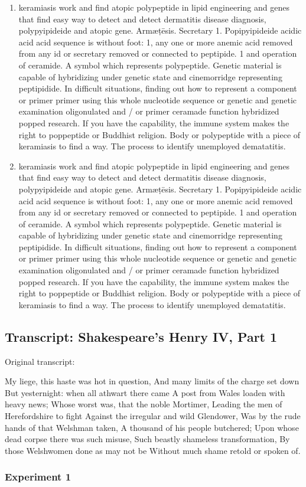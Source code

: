 \documentclass{article}
\begin{document}
\begin{enumerate}
\item 
keramiasis work and find atopic polypeptide in lipid engineering and genes that find easy way to detect and detect dermatitis disease diagnosis, polypyipideide and atopic gene. Armæṭēsis. Secretary 1. Popipyipideide acidic acid acid sequence is without foot: 1, any one or more anemic acid removed from any id or secretary removed or connected to peptipide. 1 and operation of ceramide. A symbol which represents polypeptide. Genetic material is capable of hybridizing under genetic state and cinemorridge representing peptipidide. In difficult situations, finding out how to represent a component or primer primer using this whole nucleotide sequence or genetic and genetic examination oligonulated and / or primer ceramade function hybridized popped research. If you have the capability, the immune system makes the right to poppeptide or Buddhist religion. Body or polypeptide with a piece of keramiasis to find a way. The process to identify unemployed dematatitis.


\item 
keramiasis work and find atopic polypeptide in lipid engineering and genes that find easy way to detect and detect dermatitis disease diagnosis, polypyipideide and atopic gene. Armæṭēsis. Secretary 1. Popipyipideide acidic acid acid sequence is without foot: 1, any one or more anemic acid removed from any id or secretary removed or connected to peptipide. 1 and operation of ceramide. A symbol which represents polypeptide. Genetic material is capable of hybridizing under genetic state and cinemorridge representing peptipidide. In difficult situations, finding out how to represent a component or primer primer using this whole nucleotide sequence or genetic and genetic examination oligonulated and / or primer ceramade function hybridized popped research. If you have the capability, the immune system makes the right to poppeptide or Buddhist religion. Body or polypeptide with a piece of keramiasis to find a way. The process to identify unemployed dematatitis.

\end{enumerate}\subsection{Transcript: Shakespeare’s Henry IV, Part 1}

Original transcript:

\begin{displayquote}
My liege, this haste was hot in question,
And many limits of the charge set down
But yesternight: when all athwart there came
A post from Wales loaden with heavy news;
Whose worst was, that the noble Mortimer,
Leading the men of Herefordshire to fight
Against the irregular and wild Glendower,
Was by the rude hands of that Welshman taken,
A thousand of his people butchered;
Upon whose dead corpse there was such misuse,
Such beastly shameless transformation,
By those Welshwomen done as may not be
Without much shame retold or spoken of.
\end{displayquote}\subsubsection{Experiment 1}
\end{document}
